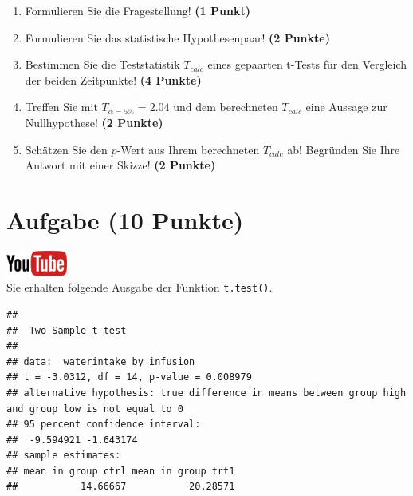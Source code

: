 \documentclass[a4paper, 10pt]{scrartcl}\usepackage[]{graphicx}\usepackage[]{xcolor}
\makeatletter
\newenvironment{kframe}{%
 \def\at@end@of@kframe{}%
 \ifinner\ifhmode%
  \def\at@end@of@kframe{\end{minipage}}%
  \begin{minipage}{\columnwidth}%
 \fi\fi%
 \def\FrameCommand##1{\hskip\@totalleftmargin \hskip-\fboxsep
 \colorbox{shadecolor}{##1}\hskip-\fboxsep
     \hskip-\linewidth \hskip-\@totalleftmargin \hskip\columnwidth}%
 \MakeFramed {\advance\hsize-\width
   \@totalleftmargin\z@ \linewidth\hsize
   \@setminipage}}%
 {\par\unskip\endMakeFramed%
 \at@end@of@kframe}
\newenvironment{knitrout}{}{} %
\makeatother
\begin{document}
\begin{enumerate}
\item Formulieren Sie die Fragestellung! \textbf{(1 Punkt)}
\item Formulieren Sie das statistische Hypothesenpaar! \textbf{(2
    Punkte)}
\item Bestimmen Sie die Teststatistik $T_{calc}$ eines gepaarten t-Tests f{\"u}r den
  Vergleich der beiden Zeitpunkte! \textbf{(4 Punkte)}
\item Treffen Sie mit $T_{\alpha = 5\%} = 2.04$ und dem berechneten $T_{calc}$ eine Aussage
  zur Nullhypothese! \textbf{(2 Punkte)}
\item Sch{\"a}tzen Sie den $p$-Wert aus Ihrem berechneten $T_{calc}$ ab!
  Begr{\"u}nden Sie Ihre Antwort mit einer Skizze! \textbf{(2
    Punkte)}
\end{enumerate} 
\clearpage

\section{Aufgabe \hfill (10 Punkte)}

\hfill\href{https://youtu.be/exDo7AyHl4Q}{\includegraphics[width =
  2cm]{img/youtube}}\\[1Ex]

Sie erhalten folgende \Rlogo Ausgabe der Funktion \texttt{t.test()}.

\begin{knitrout}
\color{fgcolor}\begin{kframe}
\begin{verbatim}
## 
## 	Two Sample t-test
## 
## data:  waterintake by infusion
## t = -3.0312, df = 14, p-value = 0.008979
## alternative hypothesis: true difference in means between group high and group low is not equal to 0
## 95 percent confidence interval:
##  -9.594921 -1.643174
## sample estimates:
## mean in group ctrl mean in group trt1 
##           14.66667           20.28571
\end{verbatim}
\end{kframe}
\end{knitrout}
\end{document}
